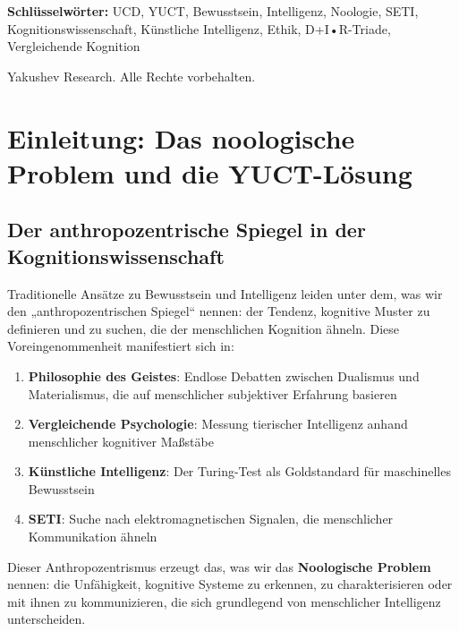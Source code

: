 \documentclass[12pt,a4paper]{article}
\begin{document}
\begin{titlepage}
\begin{center}
			\vspace{0cm}
			
			\noindent
			\small\textbf{Schlüsselwörter:} UCD, YUCT, Bewusstsein, Intelligenz, Noologie, SETI, Kognitionswissenschaft, Künstliche Intelligenz, Ethik, D+I•R-Triade, Vergleichende Kognition
			
			\vspace{0.5cm}
			
			\noindent
			 Yakushev Research. Alle Rechte vorbehalten.
		\end{center}
	\end{titlepage}
	
	\tableofcontents
	
	\newpage
	
	\section{Einleitung: Das noologische Problem und die YUCT-Lösung}
	
	\subsection{Der anthropozentrische Spiegel in der Kognitionswissenschaft}
	
	Traditionelle Ansätze zu Bewusstsein und Intelligenz leiden unter dem, was wir den „anthropozentrischen Spiegel`` nennen: der Tendenz, kognitive Muster zu definieren und zu suchen, die der menschlichen Kognition ähneln. Diese Voreingenommenheit manifestiert sich in:
	\begin{enumerate}
		\item \textbf{Philosophie des Geistes}: Endlose Debatten zwischen Dualismus und Materialismus, die auf menschlicher subjektiver Erfahrung basieren
		\item \textbf{Vergleichende Psychologie}: Messung tierischer Intelligenz anhand menschlicher kognitiver Maßstäbe
		\item \textbf{Künstliche Intelligenz}: Der Turing-Test als Goldstandard für maschinelles Bewusstsein
		\item \textbf{SETI}: Suche nach elektromagnetischen Signalen, die menschlicher Kommunikation ähneln
	\end{enumerate}
	Dieser Anthropozentrismus erzeugt das, was wir das \textbf{Noologische Problem} nennen: die Unfähigkeit, kognitive Systeme zu erkennen, zu charakterisieren oder mit ihnen zu kommunizieren, die sich grundlegend von menschlicher Intelligenz unterscheiden.
	
\end{document}
